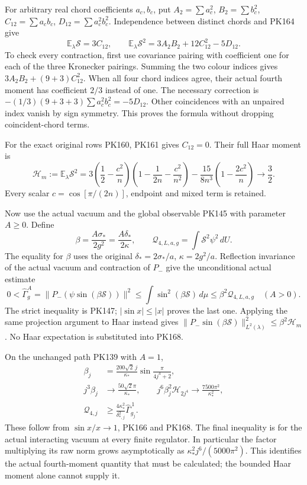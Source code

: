 \documentclass[11pt]{article}
\begin{document}
For arbitrary real chord coefficients \(a_c,b_c\), put
\(A_2=\sum a_c^2\), \(B_2=\sum b_c^2\),
\(C_{12}=\sum a_cb_c\), \(D_{12}=\sum a_c^2b_c^2\).
Independence between distinct chords and PK164 give
\[
 \mathbb E_\lambda\mathcal S=3C_{12},\qquad
 \mathbb E_\lambda\mathcal S^2
       =3A_2B_2+12C_{12}^2-5D_{12}.
 \tag{PK165}
\]
To check every contraction, first use covariance pairing with coefficient
one for each of the three Kronecker pairings. Summing the two colour
indices gives \(3A_2B_2+(9+3)C_{12}^2\).
When all four chord indices agree, their actual fourth moment has
coefficient \(2/3\) instead of one. The necessary correction is
\(-(1/3)(9+3+3)\sum a_c^2b_c^2=-5D_{12}\).
Other coincidences with an unpaired index vanish by sign symmetry.
This proves the formula without dropping coincident-chord terms.

For the exact original rows PK160, PK161 gives \(C_{12}=0\).
Their full Haar moment is
\[
 \mathcal H_m:=
 \mathbb E_\lambda\mathcal S^2
 =3\left(\frac12-\frac{c^2}{n}\right)
       \left(1-\frac1{2n}-\frac{c^2}{n^2}\right)
       -\frac{15}{8n^3}\left(1-\frac{2c^2}{n}\right)
 \longrightarrow\frac32 .
 \tag{PK166}
\]
Every scalar \(c=\cos[\pi/(2n)]\), endpoint and mixed term is retained.

Now use the actual vacuum and the global observable PK145 with
parameter \(A\ge0\). Define
\[
 \beta=\frac{A\sigma_*}{2g^2}
       =\frac{A\delta_*}{2\kappa},\qquad
 \mathcal Q_{4,L,a,g}=\int\mathcal S^2\psi^2\,dU .
 \tag{PK167}
\]
The equality for \(\beta\) uses the original
\(\delta_*=2\sigma_*/a\), \(\kappa=2g^2/a\).
Reflection invariance of the actual vacuum and contraction of \(P_-\)
give the unconditional actual estimate
\[
 0<\widehat\Gamma_g^A
   =\|P_-(\psi\sin(\beta\mathcal S))\|^2
   \le\int\sin^2(\beta\mathcal S)\,d\mu
   \le\beta^2\mathcal Q_{4,L,a,g}\quad(A>0).
 \tag{PK168}
\]
The strict inequality is PK147; \(|\sin x|\le|x|\) proves the last one.
Applying the same projection argument to Haar instead gives
\(\|P_-\sin(\beta\mathcal S)\|_{L^2(\lambda)}^2\le\beta^2\mathcal H_m\).
No Haar expectation is substituted into PK168.

On the unchanged path PK139 with \(A=1\),
\[
 \begin{split}
 \beta_j&=\frac{200\sqrt2\,j}{\kappa_*}
                 \sin\frac{\pi}{4j^4+2},\\
 j^3\beta_j&\longrightarrow\frac{50\sqrt2\pi}{\kappa_*},\qquad
 j^6\beta_j^2\mathcal H_{2j^4}
                      \longrightarrow\frac{7500\pi^2}{\kappa_*^2},\\
 \mathcal Q_{4,j}&\ge
       \frac{4\kappa_*^2}{\delta_{*,j}^2}\widehat\Gamma_{g_j}^{\,1}.
 \end{split}\tag{PK169}
\]
These follow from \(\sin x/x\to1\), PK166 and PK168.
The final inequality is for the actual interacting vacuum at every
finite regulator. In particular the factor multiplying its raw norm
grows asymptotically as \(\kappa_*^2j^6/(5000\pi^2)\).
This identifies the actual fourth-moment quantity that must be
calculated; the bounded Haar moment alone cannot supply it.
\end{document}
